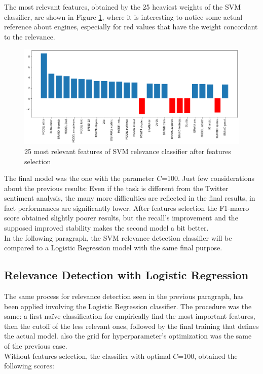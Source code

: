 The most relevant features, obtained by the 25 heaviest weights of the SVM classifier, are shown in Figure \ref{fig:ita_rel_svm_feat}, where it is interesting to notice some actual reference about engines, especially for red values that have the weight concordant to the relevance.

\begin{figure}[H]
	\centering
	\includegraphics[width=\textwidth]{figures/conf_matrices/ita_rel_svm/svm_rel_best_feat.png}
	\caption{25 most relevant features of SVM relevance classifier after features selection}
	\label{fig:ita_rel_svm_feat}
\end{figure}

The final model was the one with the parameter $C$=100. Just few considerations about the previous results: Even if the task is different from the Twitter sentiment analysis, the many more difficulties are reflected in the final results, in fact performances are significantly lower. After features selection the F1-macro score obtained slightly poorer results, but the recall's improvement and the supposed improved stability makes the second model a bit better.\\
In the following paragraph, the SVM relevance detection classifier will be compared to a Logistic Regression model with the same final purpose.


\subsection{Relevance Detection with Logistic Regression}

The same process for relevance detection seen in the previous paragraph, has been applied involving the Logistic Regression classifier. The procedure was the same: a first na{\"i}ve classification for empirically find the most important features, then the cutoff of the less relevant ones, followed by the final training that defines the actual model. also the grid for hyperparameter's optimization was the same of the previous case.\\
Without features selection, the classifier with optimal $C$=100, obtained the following scores:


